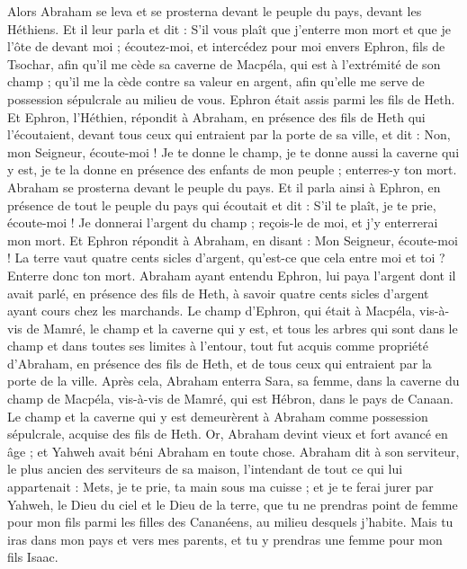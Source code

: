 \begin{multicols}{2}
Alors Abraham se leva et se prosterna devant le peuple du pays, devant les Héthiens.
Et il leur parla et dit : S'il vous plaît que j'enterre mon mort et que je l'ôte de devant moi ; écoutez-moi, et intercédez pour moi envers Ephron, fils de Tsochar,
afin qu'il me cède sa caverne de Macpéla, qui est à l’extrémité de son champ ; qu'il me la cède contre sa valeur en argent, afin qu’elle me serve de possession sépulcrale au milieu de vous.
Ephron était assis parmi les fils de Heth. Et Ephron, l’Héthien, répondit à Abraham, en présence des fils de Heth qui l'écoutaient, devant tous ceux qui entraient par la porte de sa ville, et dit :
Non, mon Seigneur, écoute-moi ! Je te donne le champ, je te donne aussi la caverne qui y est, je te la donne en présence des enfants de mon peuple ; enterres-y ton mort.
Abraham se prosterna devant le peuple du pays.
Et il parla ainsi à Ephron, en présence de tout le peuple du pays qui écoutait et dit : S'il te plaît, je te prie, écoute-moi ! Je donnerai l'argent du champ ; reçois-le de moi, et j'y enterrerai mon mort.
Et Ephron répondit à Abraham, en disant :
Mon Seigneur, écoute-moi ! La terre vaut quatre cents sicles d'argent, qu’est-ce que cela entre moi et toi ? Enterre donc ton mort.
Abraham ayant entendu Ephron, lui paya l'argent dont il avait parlé, en présence des fils de Heth, à savoir quatre cents sicles d'argent ayant cours chez les marchands.
Le champ d'Ephron, qui était à Macpéla, vis-à-vis de Mamré, le champ et la caverne qui y est, et tous les arbres qui sont dans le champ et dans toutes ses limites à l’entour,
tout fut acquis comme propriété d’Abraham, en présence des fils de Heth, et de tous ceux qui entraient par la porte de la ville.
Après cela, Abraham enterra Sara, sa femme, dans la caverne du champ de Macpéla, vis-à-vis de Mamré, qui est Hébron, dans le pays de Canaan.
Le champ et la caverne qui y est demeurèrent à Abraham comme possession sépulcrale, acquise des fils de Heth.
\VerseOne{}Or, Abraham devint vieux et fort avancé en âge ; et Yahweh avait béni Abraham en toute chose.
Abraham dit à son serviteur, le plus ancien des serviteurs de sa maison, l’intendant de tout ce qui lui appartenait : Mets, je te prie, ta main sous ma cuisse ;
et je te ferai jurer par Yahweh, le Dieu du ciel et le Dieu de la terre, que tu ne prendras point de femme pour mon fils parmi les filles des Cananéens, au milieu desquels j'habite.
Mais tu iras dans mon pays et vers mes parents, et tu y prendras une femme pour mon fils Isaac.

\end{multicols}
